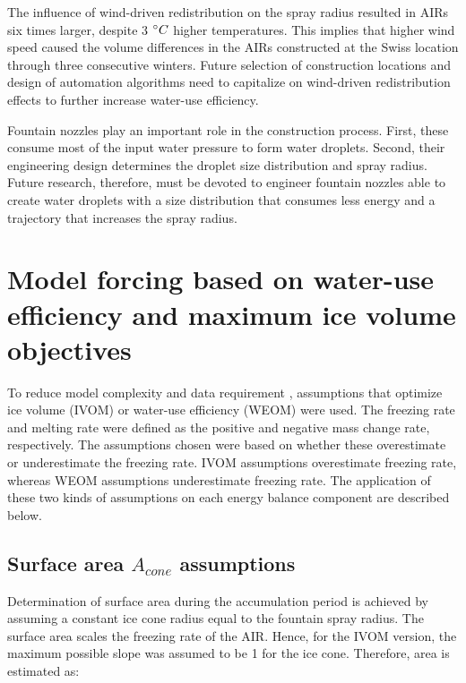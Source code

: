 \documentclass[tc, manuscript]{copernicus}
\begin{document}
The influence of wind-driven redistribution on the spray radius resulted in AIRs six times larger, despite 3
$^{\circ} C$ higher temperatures. This implies that higher wind speed caused the volume differences in the AIRs
constructed at the Swiss location through three consecutive winters. Future selection of construction locations
and design of automation algorithms need to capitalize on wind-driven redistribution effects to further increase
water-use efficiency.

Fountain nozzles play an important role in the construction process. First, these consume most of the input
water pressure to form water droplets. Second, their engineering design determines the droplet size distribution
and spray radius. Future research, therefore, must be devoted to engineer fountain nozzles able to create water
droplets with a size distribution that consumes less energy and a trajectory that increases the spray radius.

\appendix

\section{Model forcing based on water-use efficiency and maximum ice volume objectives} \label{sec:SEB}

To reduce model complexity and data requirement \citep{balasubramanianInfluenceMeteorologicalConditions2022},
assumptions that optimize ice volume (IVOM) or water-use efficiency (WEOM) were used. The freezing rate and
melting rate were defined as the positive and negative mass change rate, respectively. The assumptions chosen
were based on whether these overestimate or underestimate the freezing rate. IVOM assumptions overestimate
freezing rate, whereas WEOM assumptions underestimate freezing rate. The application of these two kinds of assumptions
on each energy balance component are described below. 

\subsection{Surface area $A_{cone}$ assumptions}

Determination of surface area during the accumulation period is achieved by assuming a constant ice cone
radius equal to the fountain spray radius. The surface area scales the freezing rate of the AIR. Hence, for the
IVOM version, the maximum possible slope was assumed to be 1 for the ice cone. Therefore, area is estimated as:  
\end{document}
